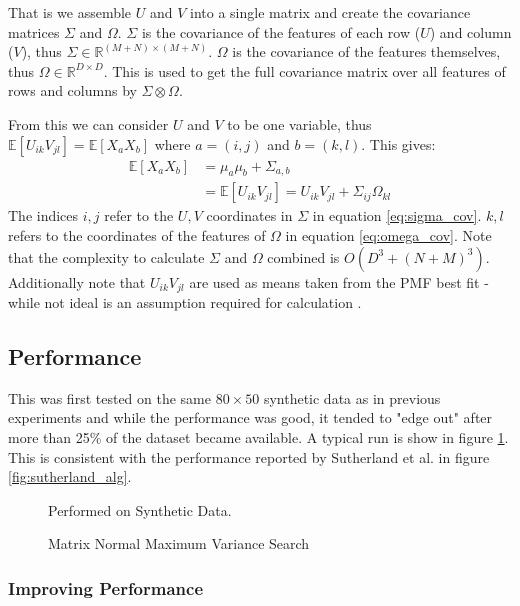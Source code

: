 That is we assemble $U$ and $V$ into a single matrix and create the covariance matrices $\Sigma$ and $\Omega$. $\Sigma$ is the covariance of the features of each row ($U$) and column ($V$), thus $\Sigma \in \mathbb{R}^{(M+N)\times (M+N)}$. $\Omega$ is the covariance of the features themselves, thus $\Omega \in \mathbb{R}^{D\times D}$. This is used to get the full covariance matrix over all features of rows and columns by $\Sigma \otimes \Omega$.

From this we can consider $U$ and $V$ to be one variable, thus $\mathbb{E}[U_{ik}V_{jl}] = \mathbb{E}[X_{a}X_{b}]$ where $a = (i,j)$ and $b=(k,l)$. This gives:
\begin{align*}
\mathbb{E}[X_a X_b]  &= \mu_a\mu_b + \Sigma_{a,b}\\
&=\mathbb{E}[U_{ik}V_{jl}] = U_{ik}V_{jl} + \Sigma_{ij} \Omega_{kl}
\end{align*}
The indices $i,j$ refer to the $U,V$ coordinates in $\Sigma$ in equation \ref{eq:sigma_cov}. $k,l$ refers to the coordinates of the features of $\Omega$ in equation \ref{eq:omega_cov}. Note that the complexity to calculate $\Sigma$ and $\Omega$ combined is $O(D^3+(N+M)^3)$. Additionally note that $U_{ik}V_{jl}$ are used as means taken from the PMF best fit - while not ideal is an assumption required for calculation \cite{active-mf}.

\subsection{Performance}

This was first tested on the same $80\times 50$ synthetic data as in previous experiments and while the performance was good, it tended to "edge out" after more than 25\% of the dataset became available. A typical run is show in figure \ref{fig:MN-V-perf}. This is consistent with the performance reported by Sutherland et al. in figure \ref{fig:sutherland_alg}. 

  \begin{figure}[!htbp]
    \begin{center}
      \resizebox{\textwidth}{!}{}
    \end{center}
    Performed on Synthetic Data.
      \caption{Matrix Normal Maximum Variance Search}
      \label{fig:MN-V-perf}
  \end{figure}
  
  
\subsubsection{Improving Performance}

